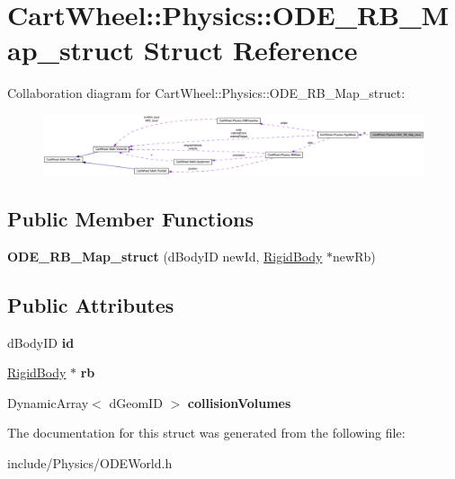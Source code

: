 \hypertarget{structCartWheel_1_1Physics_1_1ODE__RB__Map__struct}{
\section{CartWheel::Physics::ODE\_\-RB\_\-Map\_\-struct Struct Reference}
\label{structCartWheel_1_1Physics_1_1ODE__RB__Map__struct}
}


Collaboration diagram for CartWheel::Physics::ODE\_\-RB\_\-Map\_\-struct:\nopagebreak
\begin{figure}[H]
\begin{center}
\leavevmode
\includegraphics[width=400pt]{structCartWheel_1_1Physics_1_1ODE__RB__Map__struct__coll__graph}
\end{center}
\end{figure}
\subsection*{Public Member Functions}
\begin{DoxyCompactItemize}
\item 
\hypertarget{structCartWheel_1_1Physics_1_1ODE__RB__Map__struct_af60baab5c716f7e18698b90e48573364}{
{\bfseries ODE\_\-RB\_\-Map\_\-struct} (dBodyID newId, \hyperlink{classCartWheel_1_1Physics_1_1RigidBody}{RigidBody} $\ast$newRb)}
\label{structCartWheel_1_1Physics_1_1ODE__RB__Map__struct_af60baab5c716f7e18698b90e48573364}

\end{DoxyCompactItemize}
\subsection*{Public Attributes}
\begin{DoxyCompactItemize}
\item 
\hypertarget{structCartWheel_1_1Physics_1_1ODE__RB__Map__struct_a732c4e634400bb40d52b3cfa07367c35}{
dBodyID {\bfseries id}}
\label{structCartWheel_1_1Physics_1_1ODE__RB__Map__struct_a732c4e634400bb40d52b3cfa07367c35}

\item 
\hypertarget{structCartWheel_1_1Physics_1_1ODE__RB__Map__struct_a24cd1a2ad020b6cdc12f0ce52de95f52}{
\hyperlink{classCartWheel_1_1Physics_1_1RigidBody}{RigidBody} $\ast$ {\bfseries rb}}
\label{structCartWheel_1_1Physics_1_1ODE__RB__Map__struct_a24cd1a2ad020b6cdc12f0ce52de95f52}

\item 
\hypertarget{structCartWheel_1_1Physics_1_1ODE__RB__Map__struct_a9532f629b0c003c13f712737fe6ea94e}{
DynamicArray$<$ dGeomID $>$ {\bfseries collisionVolumes}}
\label{structCartWheel_1_1Physics_1_1ODE__RB__Map__struct_a9532f629b0c003c13f712737fe6ea94e}

\end{DoxyCompactItemize}


The documentation for this struct was generated from the following file:\begin{DoxyCompactItemize}
\item 
include/Physics/ODEWorld.h\end{DoxyCompactItemize}
